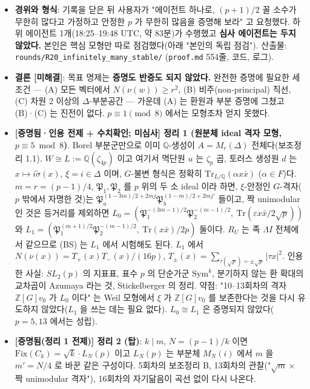 \begin{itemize}
\tightlist
\item
  \textbf{경위와 형식}: 기록을 닫은 뒤 사용자가 "에이전트 하나로, \((p+1)/2\) 꼴 소수가 무한히 많다고 가정하고 안정한 \(p\) 가 무한히 많음을 증명해 보라" 고 요청했다. 하위 에이전트 1개(18:25--19:48 UTC, 약 83분)가 수행했고 \textbf{심사 에이전트는 두지 않았다.} 본인은 핵심 모형만 따로 점검했다(아래 "본인의 독립 점검"). 산출물: \texttt{rounds/R20\_infinitely\_many\_stable/} (\texttt{proof.md} 554줄, 코드, 로그).
\item
  \textbf{결론 {[}미해결{]}}: 목표 명제는 \textbf{증명도 반증도 되지 않았다.} 완전한 증명에 필요한 세 조건 --- (A) 모든 벡터에서 \(N(\nu(w))\ge r^2\), (B) 비주(non-principal) 직선, (C) 차원 2 이상의 \(\Delta\)-부분공간 --- 가운데 (A) 는 환원과 부분 증명에 그쳤고 (B)·(C) 는 진전이 없다. \(p\equiv1\pmod8\) 에서는 모형조차 얻지 못했다.
\item
  \textbf{{[}증명됨·인용 전제 + 수치확인; 미심사{]} 정리 1 (원분체 ideal 격자 모형, \(p\equiv5\bmod8\))}. Borel 부분군만으로 이미 \(\mathbb Q\)-생성이 \(A=M_r(\Delta)\) 전체다(보조정리 1.1). \(W\cong L:=\mathbb Q(\zeta_{4p})\) 이고 여기서 멱단원 \(u\) 는 \(\zeta_p\) 곱, 토러스 생성원 \(d\) 는 \(x\mapsto i\tilde\sigma(x)\), \(\xi=i\in\Delta\) 이며, \(G\)-불변 형식은 정확히 \(\mathrm{Tr}_{L/\mathbb Q}(\alpha x\bar x)\) (\(\alpha\in F\))다. \(m=r=(p-1)/4\), \(\mathfrak P_1,\mathfrak P_2\) 를 \(p\) 위의 두 소 ideal 이라 하면, \(\xi\)-안정인 \(G\)-격자(\(p\) 밖에서 자명한 것)는 \(\mathfrak P_a^{(1-3m)/2+2mj}\mathfrak P_b^{(1-m)/2+2mj'}\) 들이고, 짝 unimodular 인 것은 등거리를 제외하면
  \(L_0=(\mathfrak P_1^{-(3m-1)/2}\mathfrak P_2^{-(m-1)/2},\ \mathrm{Tr}(\varepsilon x\bar x/2\sqrt p))\) 와 \(L_1=(\mathfrak P_1^{(m+1)/2}\mathfrak P_2^{-(m-1)/2},\ \mathrm{Tr}(x\bar x)/2p)\)
  둘이다. \(R_U\) 는 족 \(\Lambda I\) 전체에서 같으므로 (BS) 는 \(L_1\) 에서 시험해도 된다. \(L_1\) 에서 \(N(\nu(x))=T_+(x)T_-(x)/(16p)\), \(T_\pm(x)=\sum_{\tau(\sqrt p)=\pm\sqrt p}|\tau x|^2\). 인용한 사실: \(SL_2(p)\) 의 지표표, 표수 \(p\) 의 단순가군 \(\mathrm{Sym}^k\), 분기하지 않는 환 확대의 교차곱이 Azumaya 라는 것, Stickelberger 의 정리. 약점: "10--13회차의 격자 \(\mathbb Z[G]v_0\) 가 \(L_0\) 이다" 는 Weil 모형에서 \(\xi\) 가 \(\mathbb Z[G]v_0\) 를 보존한다는 것을 다시 유도하지 않았다(\(L_1\) 을 쓰는 데는 필요 없다). \(L_0\cong L_1\) 은 증명되지 않았다(\(p=5,13\) 에서는 성립).
\item
  \textbf{{[}증명됨(정리 1 전제){]} 정리 2 (탑)}: \(k\mid m\), \(N=(p-1)/k\) 이면 \(\mathrm{Fix}(C_k)=\sqrt k\cdot L_N(p)\) 이고 \(L_N(p)\) 는 부분체 \(M_N(i)\) 에서 \(m\) 을 \(m'=N/4\) 로 바꾼 같은 구성이다. 5회차의 보조정리 B, 13회차의 관찰("\(\sqrt m\times\) 짝 unimodular 격자"), 16회차의 자기닮음이 곡선 없이 다시 나온다.

\end{itemize}
